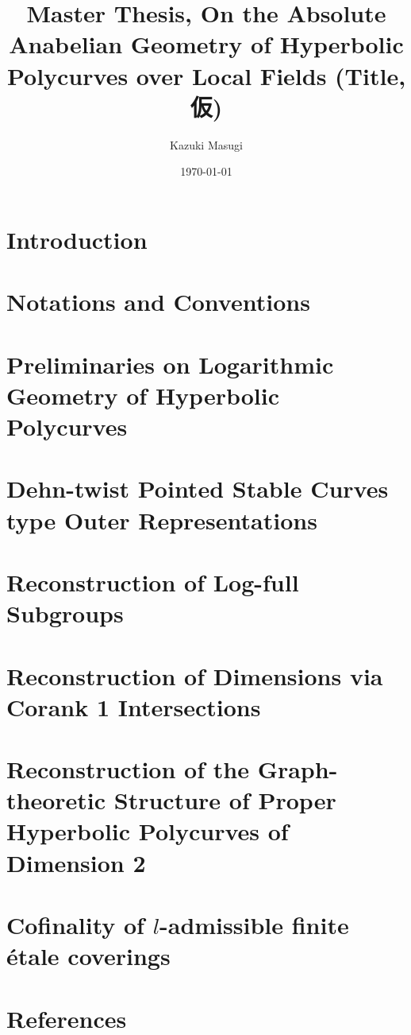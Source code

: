 \documentclass[dvipdfmx]{article}
\title{Master Thesis, On the Absolute Anabelian Geometry of Hyperbolic Polycurves over Local Fields (Title, 仮)}
\author{Kazuki Masugi}
\date{\today}
\theoremstyle{definition}
\begin{document}
\maketitle

\tableofcontents

\section*{Introduction}


\newpage
\section*{Notations and Conventions}


\newpage
\section{Preliminaries on Logarithmic Geometry of Hyperbolic Polycurves}


\newpage
\section{Dehn-twist Pointed Stable Curves type Outer Representations}


\newpage
\section{Reconstruction of Log-full Subgroups}


\newpage
\section{Reconstruction of Dimensions via Corank 1 Intersections}


\newpage
\section{Reconstruction of the Graph-theoretic Structure of Proper Hyperbolic Polycurves of Dimension 2}


\newpage
\section{Cofinality of $l$-admissible finite \'{e}tale coverings}


\newpage
\section*{References}

\end{document}
